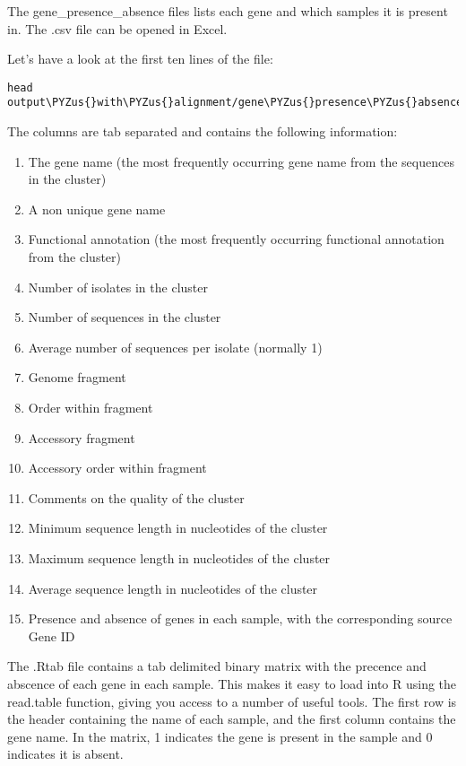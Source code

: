 \documentclass[11pt]{article}
\makeatletter
\providecommand{\tightlist}{%
      \setlength{\itemsep}{0pt}\setlength{\parskip}{0pt}}
\def\PYZus{\char`\_}
\newcommand{\boxspacing}{\kern\kvtcb@left@rule\kern\kvtcb@boxsep}
\newcommand{\prompt}[4]{
         {\ttfamily\llap{{\color{blue}\LARGE\faKeyboardO\hspace{3pt}#4}}\vspace{-\baselineskip}}
    }
\makeatother
\begin{document}
The gene\_presence\_absence files lists each gene and which samples it
is present in. The .csv file can be opened in Excel.

Let's have a look at the first ten lines of the file:

    \begin{tcolorbox}[breakable, size=fbox, boxrule=1pt, pad at break*=1mm,colback=cellbackground, colframe=cellborder]
\prompt{In}{incolor}{ }{\boxspacing}
\begin{Verbatim}[commandchars=\\\{\}]
head output\PYZus{}with\PYZus{}alignment/gene\PYZus{}presence\PYZus{}absence.csv
\end{Verbatim}
\end{tcolorbox}

    The columns are tab separated and contains the following information:

\begin{enumerate}
\def\labelenumi{\arabic{enumi}.}
\tightlist
\item
  The gene name (the most frequently occurring gene name from the
  sequences in the cluster)
\item
  A non unique gene name
\item
  Functional annotation (the most frequently occurring functional
  annotation from the cluster)
\item
  Number of isolates in the cluster
\item
  Number of sequences in the cluster
\item
  Average number of sequences per isolate (normally 1)
\item
  Genome fragment
\item
  Order within fragment
\item
  Accessory fragment
\item
  Accessory order within fragment
\item
  Comments on the quality of the cluster
\item
  Minimum sequence length in nucleotides of the cluster
\item
  Maximum sequence length in nucleotides of the cluster
\item
  Average sequence length in nucleotides of the cluster
\item
  Presence and absence of genes in each sample, with the corresponding
  source Gene ID
\end{enumerate}

The .Rtab file contains a tab delimited binary matrix with the precence
and abscence of each gene in each sample. This makes it easy to load
into R using the read.table function, giving you access to a number of
useful tools. The first row is the header containing the name of each
sample, and the first column contains the gene name. In the matrix, 1
indicates the gene is present in the sample and 0 indicates it is
absent.
\end{document}

